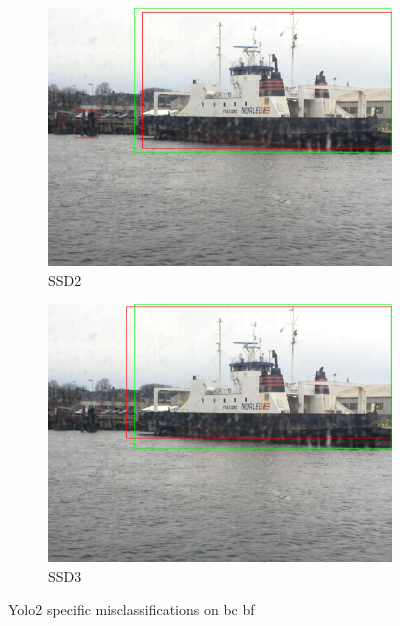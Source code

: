 \begin{figure}[h!]
\begin{subfigure}{.5\textwidth}
  \centering
  \includegraphics[width=0.8\linewidth]{results/case_buildings/ssdtrf/ssd2/3better/IMG_2570.jpg}
  \caption{SSD2}
\end{subfigure}%
\begin{subfigure}{.5\textwidth}
  \centering
  \includegraphics[width=.8\linewidth]{results/case_buildings/ssdtrf/ssd3/3better/IMG_2570.jpg}
  \caption{SSD3}
\end{subfigure}
\caption{Yolo2 specific misclassifications on bc bf}
\label{img:yolo2_misclas}


\end{figure}
